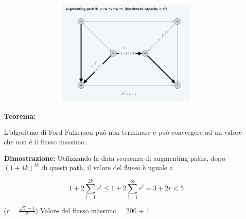 \begin{figure}[H]
\begin{subfigure}{\textwidth}
\begin{subfigure}{.33\textwidth}
			\includegraphics[width=\linewidth]{Network_flow/imgs/ex9.png}
		\end{subfigure}
	\end{subfigure}
\end{figure}

\textbf{Teorema:}
\begin{myblockquote}
L'algoritmo di Ford-Fulkerson
può non terminare e può convergere ad un valore che non è il flusso
massimo.
\end{myblockquote}

\textbf{Dimostrazione:} Utilizzando la data sequenza di augmenting
paths, dopo $(1+4k)^{th}$ di questi path, il valore del flusso è
uguale a

$$
1 + 2 \sum^{2k}_{i=1}r^i \le 1 + 2 \sum^{\infty}_{i=1}r^i = 3 + 2r < 5
$$

($r = \frac{\sqrt{5}-1}{2}$) Valore del flusso massimo = 200 + 1
